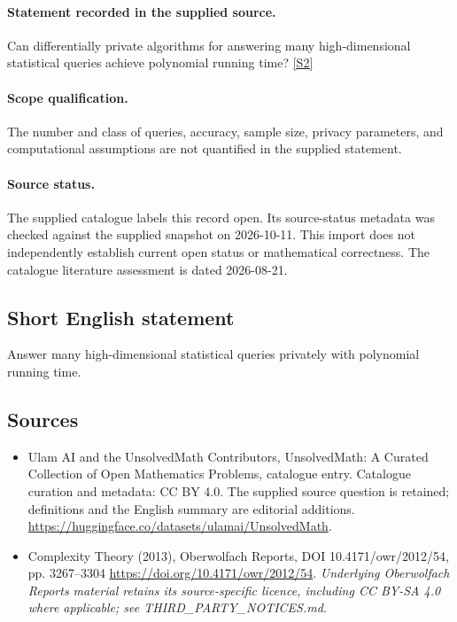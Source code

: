 \documentclass[11pt]{article}
\begin{document}
\paragraph{Statement recorded in the supplied source.}
Can differentially private algorithms for answering many high-dimensional statistical queries achieve polynomial running time? \href{https://doi.org/10.4171/owr/2012/54}{[S2]}
\paragraph{Scope qualification.}
The number and class of queries, accuracy, sample size, privacy parameters, and computational assumptions are not quantified in the supplied statement.
\paragraph{Source status.}
The supplied catalogue labels this record open. Its source-status metadata was checked against the supplied snapshot on 2026-10-11. This import does not independently establish current open status or mathematical correctness. The catalogue literature assessment is dated 2026-08-21.
\subsection{Short English statement}
Answer many high-dimensional statistical queries privately with polynomial running time.
\subsection{Sources}
\begin{itemize}
\item[S1] Ulam AI and the UnsolvedMath Contributors, UnsolvedMath: A Curated Collection of Open Mathematics Problems, catalogue entry. Catalogue curation and metadata: CC BY 4.0. The supplied source question is retained; definitions and the English summary are editorial additions.
\url{https://huggingface.co/datasets/ulamai/UnsolvedMath}.
\item[S2] Complexity Theory (2013), Oberwolfach Reports, DOI 10.4171/owr/2012/54, pp. 3267--3304
\url{https://doi.org/10.4171/owr/2012/54}.
\textit{Underlying Oberwolfach Reports material retains its source-specific licence, including CC BY-SA 4.0 where applicable; see THIRD\_PARTY\_NOTICES.md.}
\end{itemize}
\end{document}
